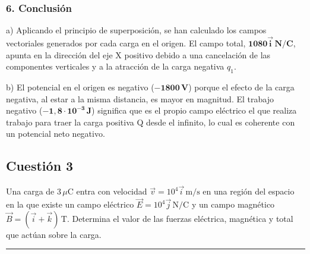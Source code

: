\subsubsection*{6. Conclusión}
\begin{cajaconclusion}
a) Aplicando el principio de superposición, se han calculado los campos vectoriales generados por cada carga en el origen. El campo total, $\mathbf{1080\vec{i} \, N/C}$, apunta en la dirección del eje X positivo debido a una cancelación de las componentes verticales y a la atracción de la carga negativa $q_1$.

b) El potencial en el origen es negativo ($\mathbf{-1800 \, V}$) porque el efecto de la carga negativa, al estar a la misma distancia, es mayor en magnitud. El trabajo negativo ($\mathbf{-1,8 \cdot 10^{-3} \, J}$) significa que es el propio campo eléctrico el que realiza trabajo para traer la carga positiva Q desde el infinito, lo cual es coherente con un potencial neto negativo.
\end{cajaconclusion}

\newpage



\subsection{Cuestión 3}
\label{subsec:C3_2022_jul_ord}

\begin{cajaenunciado}
Una carga de $3\,\mu\text{C}$ entra con velocidad $\vec{v}=10^4\vec{i}\,\text{m/s}$ en una región del espacio en la que existe un campo eléctrico $\vec{E}=10^4\vec{j}\,\text{N/C}$ y un campo magnético $\vec{B}=(\vec{i}+\vec{k})\,\text{T}$. Determina el valor de las fuerzas eléctrica, magnética y total que actúan sobre la carga.
\end{cajaenunciado}
\hrule

